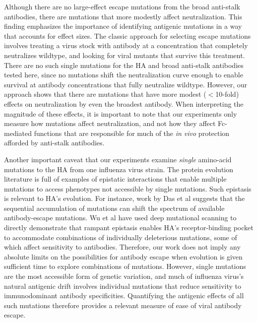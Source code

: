 \documentclass[11pt]{article}
\begin{document}
Although there are no large-effect escape mutations from the broad anti-stalk antibodies, there are mutations that more modestly affect neutralization.
This finding emphasizes the importance of identifying antigenic mutations in a way that accounts for effect sizes.
The classic approach for selecting escape mutations involves treating a virus stock with antibody at a concentration that completely neutralizes wildtype, and looking for viral mutants that survive this treatment\cite{yewdell1979antigenic,webster1980determination}.
There are no such single mutations for the HA and broad anti-stalk antibodies tested here, since no mutations shift the neutralization curve enough to enable survival at antibody concentrations that fully neutralize wildtype.
However, our approach shows that there are mutations that have more modest ($<$10-fold) effects on neutralization by even the broadest antibody. 
When interpreting the magnitude of these effects, it is important to note that our experiments only measure how mutations affect neutralization, and not how they affect Fc-mediated functions that are responsible for much of the \textit{in vivo} protection afforded by anti-stalk antibodies\cite{dilillo2014broadly,dilillo2016broadly}.

Another important caveat that our experiments examine \emph{single} amino-acid mutations to the HA from one influenza virus strain.
The protein evolution literature is full of examples of epistatic interactions that enable multiple mutations to access phenotypes not accessible by single mutations\cite{gong2013stability,harms2014historical,starr2017alternative}.
Such epistasis is relevant to HA's evolution.  
For instance, work by Das et al\cite{das2013defining} suggests that the sequential accumulation of mutations can shift the spectrum of available antibody-escape mutations.
Wu et al\cite{wu2017diversity} have used deep mutational scanning to directly demonstrate that rampant epistasis enables HA's receptor-binding pocket to accommodate combinations of individually deleterious mutations, some of which affect sensitivity to antibodies.
Therefore, our work does not imply any absolute limits on the possibilities for antibody escape when evolution is given sufficient time to explore combinations of mutations.
However, single mutations are the most accessible form of genetic variation, and much of influenza virus's natural antigenic drift involves individual mutations that reduce sensitivity to immunodominant antibody specificities\cite{yewdell1979antigenic,webster1980determination,koel2013substitutions,chambers2015identification,petrie2016antibodies,neher2016prediction}.
Quantifying the antigenic effects of all such mutations therefore provides a relevant measure of ease of viral antibody escape. 
\end{document}
